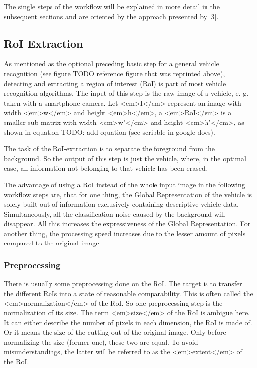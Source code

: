 The single steps of the workflow will be explained in more detail in the subsequent sections and are oriented by the approach presented by [3].

\subsection{RoI Extraction}
As mentioned as the optional preceding basic step for a general vehicle recognition (see figure TODO reference figure that was reprinted above), detecting and extracting a region of interest (RoI) is part of most vehicle recognition algorithms. The input of this step is the raw image of a vehicle, e. g. taken with a smartphone camera.
Let <em>I</em> represent an image with width <em>w</em> and height <em>h</em>, a <em>RoI</em> is a smaller sub-matrix with width <em>w’</em> and height <em>h’</em>, as shown in equation TODO: add equation (see scribble in google docs).

The task of the RoI-extraction is to separate the foreground from the background. So the output of this step is just the vehicle, where, in the optimal case, all information not belonging to that vehicle has been erased.

The advantage of using a RoI instead of the whole input image in the following workflow steps are, that for one thing, the Global Representation of the vehicle is solely built out of information exclusively containing descriptive vehicle data. Simultaneously, all the classification-noise caused by the background will disappear. All this increases the expressiveness of the Global Representation. For another thing, the processing speed increases due to the lesser amount of pixels compared to the original image.

\subsubsection{Preprocessing}
There is usually some preprocessing done on the RoI. The target is to transfer the different RoIs into a state of reasonable comparability. This is often called the <em>normalization</em> of the RoI. So one preprocessing step is the normalization of its size. The term <em>size</em> of the RoI is ambigue here. It can either describe the number of pixels in each dimension, the RoI is made of. Or it means the size of the cutting out of the original image. Only before normalizing the size (former one), these two are equal. To avoid misunderstandings, the latter will be referred to as the <em>extent</em> of the RoI.

